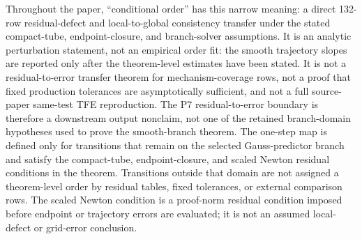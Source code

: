 \documentclass[preprint,12pt]{elsarticle}
\newcommand{\tfe}{TFE}
\begin{document}
Throughout the paper, ``conditional order'' has this narrow meaning: a direct
132-row residual-defect and local-to-global consistency transfer under the
stated compact-tube, endpoint-closure, and branch-solver assumptions. It is
an analytic perturbation statement, not an empirical order fit: the smooth
trajectory slopes are reported only after the theorem-level estimates have
been stated. It is not a residual-to-error transfer theorem for mechanism-coverage
rows, not a proof that fixed production tolerances are asymptotically
sufficient, and not a full source-paper same-test \tfe{} reproduction.
The P7 residual-to-error boundary is therefore a downstream output nonclaim,
not one of the retained branch-domain hypotheses used to prove the
smooth-branch theorem.
The one-step map is defined only for transitions that remain on the selected
Gauss-predictor branch and satisfy the compact-tube, endpoint-closure, and
scaled Newton residual conditions in the theorem. Transitions outside that
domain are not assigned a theorem-level order by residual tables, fixed
tolerances, or external comparison rows.
The scaled Newton condition is a proof-norm residual condition imposed before
endpoint or trajectory errors are evaluated; it is not an assumed
local-defect or grid-error conclusion.
\end{document}
